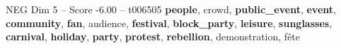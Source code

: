 \begin{textsample}{NEG Dim 5 – Score -6.00 – t006505}  \label{ex:f5_neg_028}
\textbf{people}, crowd, \textbf{public\_event}, \textbf{event}, \textbf{community}, \textbf{fan}, audience, \textbf{festival}, \textbf{block\_party}, \textbf{leisure}, \textbf{sunglasses}, \textbf{carnival}, \textbf{holiday}, \textbf{party}, \textbf{protest}, \textbf{rebellion}, demonstration, fête

\end{textsample}
